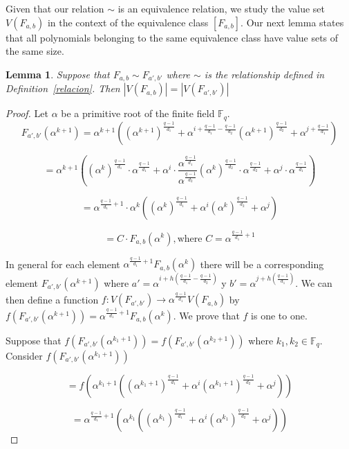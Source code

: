 \documentclass{article}
\newtheorem{lemma}[theorem]{Lemma}
\theoremstyle{definition}
\theoremstyle{remark}
\numberwithin{equation}{section}
\begin{document}
Given that our relation $\sim$ is an equivalence relation, we study the value set $V(F_{a,b})$ in the context of the equivalence class $[F_{a,b}]$. Our next lemma states that all polynomials belonging to the same equivalence class have value sets of the same size. 

\begin{lemma}
  
  Suppose that $F_{a,b} \sim F_{a',b'}$ where $\sim$ is the relationship defined in Definition~\ref{relacion}. Then $|V(F_{a,b})| = |V(F_{a',b'})|$

\end{lemma}

\begin{proof}
  
  Let $\alpha$ be a primitive root of the finite field $\mathbb{F}_q$. $$F_{a', b'}(\alpha^{k+1}) = \alpha^{k+1}((\alpha^{k+1})^{\frac{q-1}{d_1}} + \alpha^{i + \frac{q-1}{d_1} - \frac{q-1}{d_2}}(\alpha^{k+1})^{\frac{q-1}{d_2}} + \alpha^{j + \frac{q-1}{d_1}})$$

  $$= \alpha^{k+1}((\alpha^{k})^{\frac{q-1}{d_1}} \cdot \alpha^{\frac{q-1}{d_1}} + \alpha^{i} \cdot \frac{\alpha^{\frac{q-1}{d_1}}} {\alpha^{\frac{q-1}{d_2}}} (\alpha^{k})^{\frac{q-1}{d_2}} \cdot \alpha^{\frac{q-1}{d_2}} + \alpha^{j} \cdot \alpha^{\frac{q-1}{d_1}})$$

  $$= \alpha^{\frac{q-1}{d_1} + 1} \cdot \alpha^{k}((\alpha^{k})^{\frac{q-1}{d_1}} + \alpha^{i}(\alpha^{k})^{\frac{q-1}{d_2}} + \alpha^{j} )$$

  $$= C \cdot F_{a,b}(\alpha^k), \mbox{where } C = \alpha^{\frac{q-1}{d_1} + 1}$$

  In general for each element $\alpha^{\frac{q-1}{d_1} + 1}F_{a,b}(\alpha^{k})$ there will be a corresponding element $F_{a',b'}(\alpha^{k+1})$ where $a' = \alpha^{i + h(\frac{q-1}{d_1} - \frac{q-1}{d_2})}$ y $b'= \alpha^{j + h(\frac{q-1}{d_1})}$. We can then define a function $f:V(F_{a',b'}) \rightarrow \alpha^{\frac{q-1}{d_1}}V(F_{a,b})$ by $f(F_{a', b'}(\alpha^{k+1})) = \alpha^{\frac{q-1}{d_1}+1}F_{a, b}(\alpha^k)$. We prove that $f$ is one to one.


  Suppose that $f(F_{a', b'}(\alpha^{k_1+1})) = f(F_{a', b'}(\alpha^{k_2+1}))$ where $k_1, k_2 \in \mathbb{F}_q$. Consider $f(F_{a', b'}(\alpha^{k_1+1}))$

  $$= f(\alpha^{k_1+1}((\alpha^{k_1+1})^{\frac{q-1}{d_1}} + \alpha^{i}(\alpha^{k_1+1})^{\frac{q-1}{d_2}} + \alpha^{j}))$$ 

  $$= \alpha^{\frac{q-1}{d_1}+1}(\alpha^{k_1}((\alpha^{k_1})^{\frac{q-1}{d_1}} + \alpha^{i}(\alpha^{k_1})^{\frac{q-1}{d_2}} + \alpha^{j}))$$ 


\end{proof}
\end{document}
